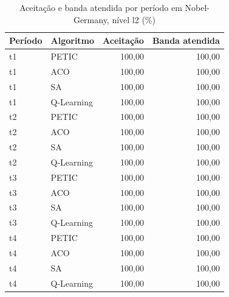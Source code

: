 \begin{table}[htb]
    \centering
    \scriptsize
    \caption{Aceitação e banda atendida por período em Nobel-Germany, nível l2 (\%)}
    \label{tab:periodos-nobel-germany-l2}
    \begin{tabular}{llrr}
        \hline
        Período & Algoritmo & Aceitação & Banda atendida \\
        \hline
        t1 & PETIC & 100,00 & 100,00 \\
        t1 & ACO & 100,00 & 100,00 \\
        t1 & SA & 100,00 & 100,00 \\
        t1 & Q-Learning & 100,00 & 100,00 \\
        t2 & PETIC & 100,00 & 100,00 \\
        t2 & ACO & 100,00 & 100,00 \\
        t2 & SA & 100,00 & 100,00 \\
        t2 & Q-Learning & 100,00 & 100,00 \\
        t3 & PETIC & 100,00 & 100,00 \\
        t3 & ACO & 100,00 & 100,00 \\
        t3 & SA & 100,00 & 100,00 \\
        t3 & Q-Learning & 100,00 & 100,00 \\
        t4 & PETIC & 100,00 & 100,00 \\
        t4 & ACO & 100,00 & 100,00 \\
        t4 & SA & 100,00 & 100,00 \\
        t4 & Q-Learning & 100,00 & 100,00 \\
        \hline
    \end{tabular}
\end{table}

